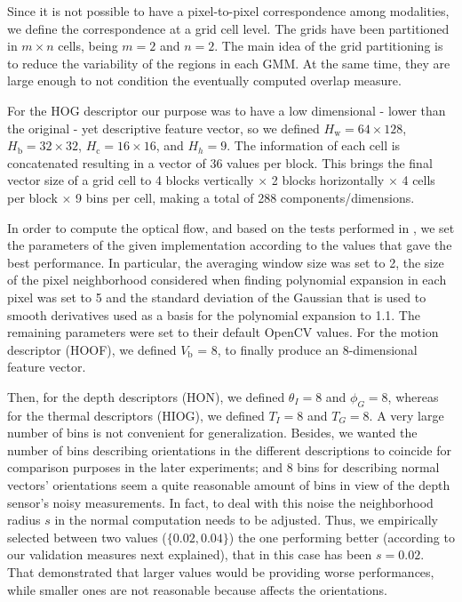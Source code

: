 \documentclass[10pt,twocolumn,letterpaper]{article}
\begin{document}
Since it is not possible to have a pixel-to-pixel correspondence among modalities, we define the correspondence at a grid cell level. The grids have been partitioned in $m \times n$ cells, being $m = 2$ and $n = 2$. The main idea of the grid partitioning is to reduce the variability of the regions in each GMM. At the same time, they are large enough to not condition the eventually computed overlap measure.

For the HOG descriptor our purpose was to have a low dimensional - lower than the original - yet descriptive feature vector, so we defined $H_\text{w} = 64 \times 128$, $H_\text{b} = 32 \times 32$, $H_\text{c}=16 \times 16$, and $H_{h} = 9$. The information of each cell is concatenated resulting in a vector of 36 values per block. This brings the final vector size of a grid cell to 4 blocks vertically $\times$ 2 blocks horizontally $\times$ 4 cells per block $\times$ 9 bins per cell, making a total of 288 components/dimensions. 

In order to compute the optical flow, and based on the tests performed in \cite{brkic2013combining}, we set the parameters of the given implementation according to the values that gave the best performance. In particular, the averaging window size was set to 2, the size of the pixel neighborhood considered when finding polynomial expansion in each pixel was set to 5 and the standard deviation of the Gaussian that is used to smooth derivatives used as a basis for the polynomial expansion to 1.1.  The remaining parameters were set to their default OpenCV values. For the motion descriptor (HOOF), we defined $V_\text{b}$ = 8, to finally produce an 8-dimensional feature vector. 

Then, for the depth descriptors (HON), we defined $\theta_{I} = 8$ and $\phi_{G} = 8$, whereas for the thermal descriptors (HIOG), we defined $T_{I} = 8$ and $T_{G} = 8$. A very large number of bins is not convenient for generalization. Besides, we wanted the number of bins describing orientations in the different descriptions to coincide for comparison purposes in the later experiments; and 8 bins for describing normal vectors' orientations seem a quite reasonable amount of bins in view of the depth sensor's noisy measurements. In fact, to deal with this noise the neighborhood radius $s$ in the normal computation needs to be adjusted. Thus, we empirically selected between two values ($\{0.02, 0.04\}$) the one performing better (according to our validation measures next explained), that in this case has been $s = 0.02$. That demonstrated that larger values would be providing worse performances, while smaller ones are not reasonable because affects the orientations.
\end{document}

